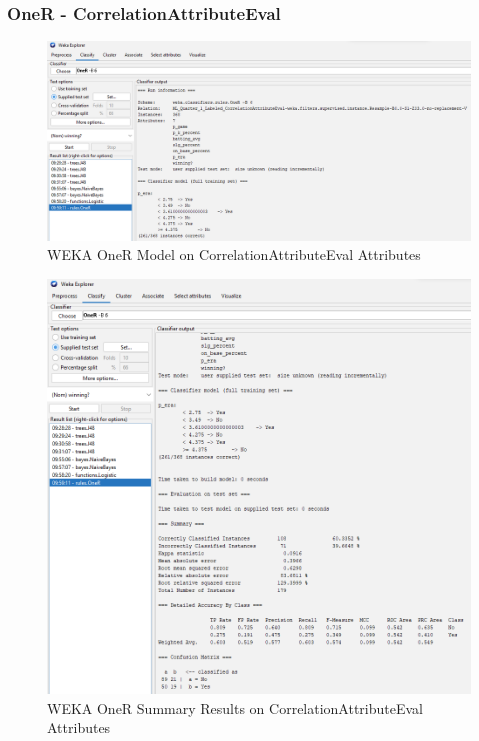 \documentclass[12pt]{article}
\begin{document}
\subsubsection{OneR - CorrelationAttributeEval}
\begin{figure}[h!]
    \includegraphics[scale=0.4]{./images/CorrelationAttributeEval/OneR-Model.png}
\centering
    \caption{WEKA OneR Model on CorrelationAttributeEval Attributes}
\end{figure}
\newpage
\begin{figure}[h!]
    \includegraphics[scale=0.4]{./images/CorrelationAttributeEval/OneR-Summary.png}
\centering
    \caption{WEKA OneR Summary Results on CorrelationAttributeEval Attributes}
\end{figure}
\end{document}
